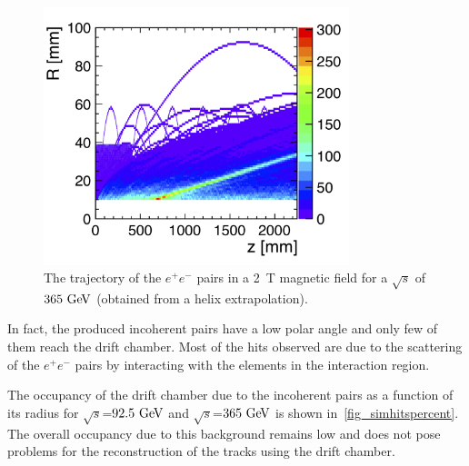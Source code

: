 \documentclass{article}
\begin{document}
\begin{figure}[!h]
\centering
\includegraphics[width=3.5in]{figures/pairs_R_Z.png}
\caption{The trajectory of the $e^+e^-$ pairs in a 2~T magnetic field for a $\sqrt{s}$ of $365\,\mathrm{\,Ge\kern -0.1em V}$ (obtained from a helix extrapolation).}
\label{fig_pairbcg}
\end{figure}

In fact, the produced incoherent pairs have a low polar angle and only few of them reach the drift chamber. Most of the hits observed are due to the scattering of the $e^+e^-$ pairs by interacting with the elements in the interaction region.


The occupancy of the drift chamber due to the incoherent pairs as a function of its radius for $\sqrt{s}$=$92.5\,\mathrm{\,Ge\kern -0.1em V}$ and $\sqrt{s}$=$365\,\mathrm{\,Ge\kern -0.1em V}$ is shown in~\cref{fig_simhitspercent}. The overall occupancy due to this background remains low and does not pose problems for the reconstruction of the tracks using the drift chamber.
\end{document}
